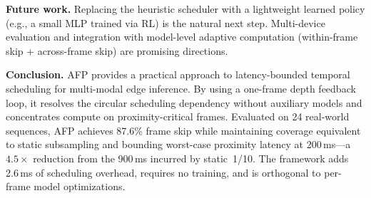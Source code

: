 \documentclass[conference]{IEEEtran}
\begin{document}
\textbf{Future work.} Replacing the heuristic scheduler with a
lightweight learned policy (e.g., a small MLP trained via RL)
is the natural next step. Multi-device evaluation and integration
with model-level adaptive computation (within-frame skip + 
across-frame skip) are promising directions.

\textbf{Conclusion.} AFP provides a practical approach to
latency-bounded temporal scheduling for multi-modal edge
inference. By using a one-frame depth feedback loop, it
resolves the circular scheduling dependency without auxiliary
models and concentrates compute on proximity-critical frames.
Evaluated on 24 real-world sequences, AFP achieves 87.6\% frame
skip while maintaining coverage equivalent to static subsampling
and bounding worst-case proximity latency at 200\,ms---a
$4.5\times$ reduction from the 900\,ms incurred by static~1/10.
The framework adds 2.6\,ms of scheduling overhead, requires no
training, and is orthogonal to per-frame model optimizations.
\newpage



\end{document}
